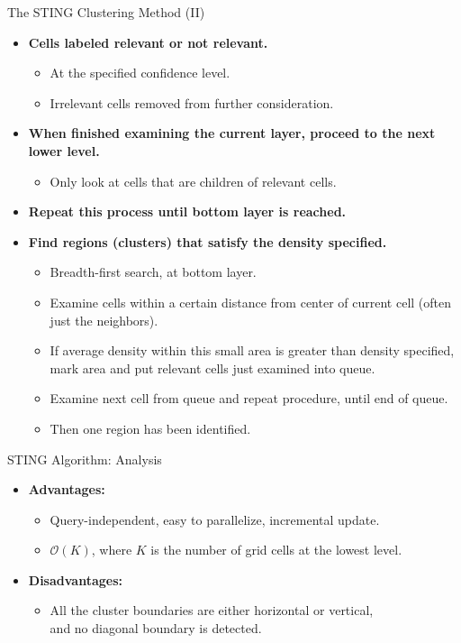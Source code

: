 \begin{frame}{The STING Clustering Method (II)}
	\begin{itemize}
		\item \textbf{Cells labeled relevant or not relevant.}
		      \begin{itemize}
			      \item At the specified confidence level.
			      \item Irrelevant cells removed from further consideration.
		      \end{itemize}
		\item \textbf{When finished examining the current layer, proceed to the
			      next lower level.}
		      \begin{itemize}
			      \item Only look at cells that are children of relevant cells.
		      \end{itemize}
		\item \textbf{Repeat this process until bottom layer is reached.}
		\item \textbf{Find regions (clusters) that satisfy the
				      {\color{airforceblue}density} specified.}
		      \begin{itemize}
			      \item Breadth-first search, at bottom layer.
			      \item Examine cells within a certain distance from center of
			            current cell (often just the neighbors).
			      \item If average density within this small area is greater than
			            density specified, mark area and put relevant cells just examined
			            into queue.
			      \item Examine next cell from queue and repeat procedure, until end
			            of queue.
			      \item Then one region has been identified.
		      \end{itemize}
	\end{itemize}
\end{frame}

\begin{frame}{STING Algorithm: Analysis}
	\begin{itemize}
		\item \textbf{Advantages:}
		      \begin{itemize}
			      \item Query-independent, easy to parallelize, incremental update.
			      \item $\mathcal{O}(K)$, where $K$ is the number of grid cells at
			            the lowest level.
		      \end{itemize}
		\item \textbf{Disadvantages:}
		      \begin{itemize}
			      \item All the cluster boundaries are either horizontal or vertical,
			            \\
			            and no diagonal boundary is detected.
		      \end{itemize}
	\end{itemize}
\end{frame}

